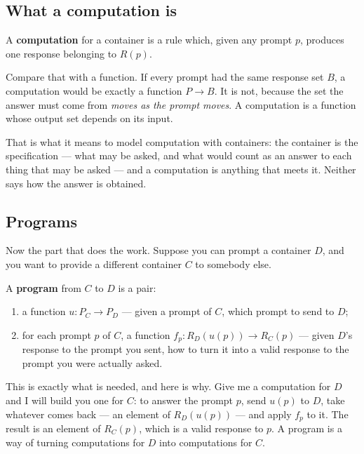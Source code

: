 \documentclass[11pt,a4paper]{article}
\begin{document}
\subsection*{What a computation is}

\begin{keybox}
A \textbf{computation} for a container is a rule which, given any prompt $p$,
produces one response belonging to $R(p)$.
\end{keybox}

Compare that with a function. If every prompt had the same response set $B$, a
computation would be exactly a function $P \to B$. It is not, because the set
the answer must come from \emph{moves as the prompt moves}. A computation is a
function whose output set depends on its input.

That is what it means to model computation with containers: the container is
the specification --- what may be asked, and what would count as an answer to
each thing that may be asked --- and a computation is anything that meets it.
Neither says how the answer is obtained.

\subsection*{Programs}

Now the part that does the work. Suppose you can prompt a container $D$, and
you want to provide a different container $C$ to somebody else.

A \textbf{program} from $C$ to $D$ is a pair:

\begin{enumerate}
\item a function $u : P_C \to P_D$ --- given a prompt of $C$, which prompt to
      send to $D$;
\item for each prompt $p$ of $C$, a function
      $f_p : R_D(u(p)) \to R_C(p)$ --- given $D$'s response to the prompt you
      sent, how to turn it into a valid response to the prompt you were
      actually asked.
\end{enumerate}

This is exactly what is needed, and here is why. Give me a computation for $D$
and I will build you one for $C$: to answer the prompt $p$, send $u(p)$ to $D$,
take whatever comes back --- an element of $R_D(u(p))$ --- and apply $f_p$ to
it. The result is an element of $R_C(p)$, which is a valid response to $p$. A
program is a way of turning computations for $D$ into computations for $C$.
\end{document}
